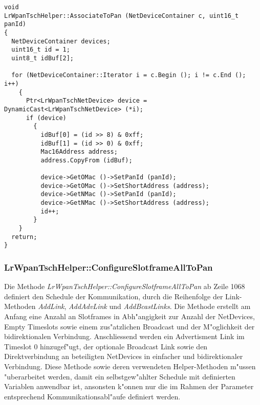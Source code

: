 \begin{lstfloat}
\begin{lstlisting}[frame=single]
void
LrWpanTschHelper::AssociateToPan (NetDeviceContainer c, uint16_t panId)
{
  NetDeviceContainer devices;
  uint16_t id = 1;
  uint8_t idBuf[2];

  for (NetDeviceContainer::Iterator i = c.Begin (); i != c.End (); i++)
    {
      Ptr<LrWpanTschNetDevice> device = DynamicCast<LrWpanTschNetDevice> (*i);
      if (device)
        {
          idBuf[0] = (id >> 8) & 0xff;
          idBuf[1] = (id >> 0) & 0xff;
          Mac16Address address;
          address.CopyFrom (idBuf);

          device->GetOMac ()->SetPanId (panId);
          device->GetOMac ()->SetShortAddress (address);
          device->GetNMac ()->SetPanId (panId);
          device->GetNMac ()->SetShortAddress (address);
          id++;
        }
    }
  return;
}
\end{lstlisting}
\end{lstfloat}

\subsubsection{LrWpanTschHelper::ConfigureSlotframeAllToPan}

Die Methode \textit{LrWpanTschHelper::ConfigureSlotframeAllToPan} ab Zeile 1068
definiert den Schedule der Kommunikation, durch die Reihenfolge der
Link-Methoden \textit{AddLink}, \textit{AddAdvLink} und \textit{AddBcastLinks}.
Die Methode erstellt am Anfang eine Anzahl an Slotframes in Abh"angigkeit
zur Anzahl der NetDevices, Empty Timeslots sowie einem zus"atzlichen Broadcast
und der M"oglichkeit der bidirektionalen Verbindung. Anschliessend werden
ein Advertisment Link im Timeslot 0 hinzugef"ugt, der optionale Broadcast Link
sowie den Direktverbindung an beteiligten NetDevices in einfacher und bidirektionaler
Verbindung.
Diese Methode sowie deren verwendeten Helper-Methoden m"ussen "uberarbeitet
werden, damit ein selbstgew"ahlter Schedule mit definierten Variablen anwendbar ist,
ansonsten k"onnen nur die im Rahmen der Parameter entsprechend Kommunikationsabl"aufe
definiert werden.


